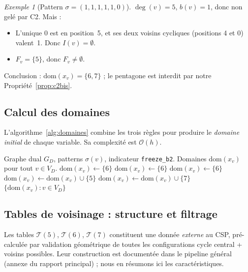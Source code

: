 \documentclass[12pt,a4paper]{article}
\theoremstyle{definition}
\theoremstyle{remark}
\newtheorem{exemple}[definition]{Exemple}
\newcommand{\GD}{G_{\!D}}
\newcommand{\VD}{V_{\!D}}
\newcommand{\xv}{x_v}
\newcommand{\degv}{\deg(v)}
\newcommand{\dom}{\mathrm{dom}}
\newcommand{\bigO}{\mathcal{O}}
\begin{document}
\begin{exemple}[Pattern $\sigma = (1,1,1,1,1,0)$]
$\degv = 5$, $b(v) = 1$, donc non gel\'e par C2. Mais :
\begin{itemize}
  \item L'unique $0$ est en position~5, et ses deux voisins cycliques
        (positions 4 et 0) valent~1. Donc $I(v) = \emptyset$.
  \item $F_v = \{5\}$, donc $F_v \neq \emptyset$.
\end{itemize}
Conclusion : $\dom(\xv) = \{6, 7\}$ ; le pentagone est interdit par
notre Propri\'et\'e~\ref{prop:c2bis}.
\end{exemple}

\subsection{Calcul des domaines}

L'algorithme~\ref{alg:domaines} combine les trois r\`egles pour produire
le \emph{domaine initial} de chaque variable. Sa complexit\'e est
$\bigO(h)$.

\begin{algorithm}[!ht]
\caption{Calcul des domaines initiaux $\dom(\xv)$.}
\label{alg:domaines}
\begin{algorithmic}[1]
\Require Graphe dual $\GD$, patterns $\sigma(v)$, indicateur \texttt{freeze\_b2}.
\Ensure Domaines $\dom(\xv)$ pour tout $v \in \VD$.
\For{$v \in \VD$}
  \If{$\degv = 6$} 
    \State $\dom(\xv) \gets \{6\}$
   
    \State $\dom(\xv) \gets \{6\}$
  \Else {}
    \State $\dom(\xv) \gets \{6\}$
      \State $\dom(\xv) \gets \dom(\xv) \cup \{5\}$
    \EndIf
      \State $\dom(\xv) \gets \dom(\xv) \cup \{7\}$
    \EndIf
  \EndIf
\EndFor
\State \Return $\{\dom(\xv) : v \in \VD\}$
\end{algorithmic}
\end{algorithm}

\subsection{Tables de voisinage : structure et filtrage}

Les tables $\mathcal{T}(5)$, $\mathcal{T}(6)$, $\mathcal{T}(7)$
constituent une donn\'ee \emph{externe} au CSP, pr\'e-calcul\'ee par
validation g\'eom\'etrique de toutes les configurations \og cycle central
+ voisins \fg{} possibles. Leur construction est document\'ee dans le
pipeline g\'en\'eral (annexe du rapport principal) ; nous en r\'esumons
ici les caract\'eristiques.
\end{document}
